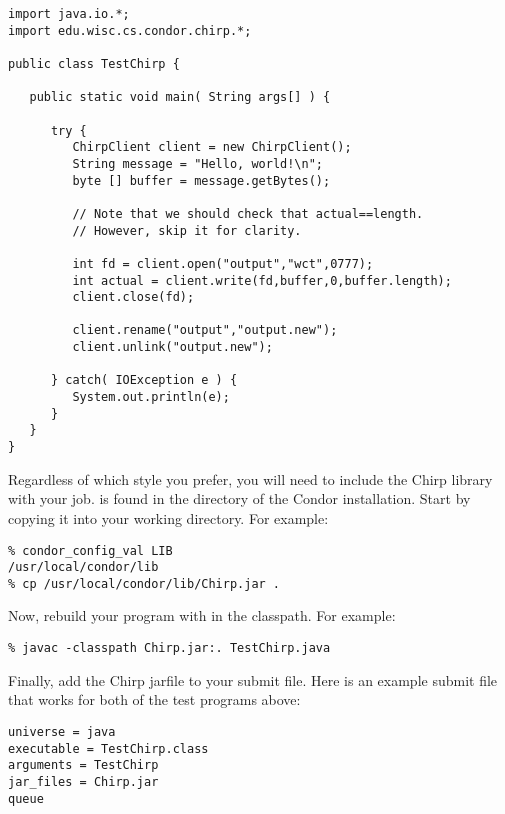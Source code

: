 \begin{verbatim}
import java.io.*;
import edu.wisc.cs.condor.chirp.*;

public class TestChirp {

   public static void main( String args[] ) {

      try {
         ChirpClient client = new ChirpClient();
         String message = "Hello, world!\n";
         byte [] buffer = message.getBytes();

         // Note that we should check that actual==length.
         // However, skip it for clarity.

         int fd = client.open("output","wct",0777);
         int actual = client.write(fd,buffer,0,buffer.length);
         client.close(fd);

         client.rename("output","output.new");
         client.unlink("output.new");

      } catch( IOException e ) {
         System.out.println(e);
      }
   }
}
\end{verbatim}

Regardless of which style you prefer, you will need to
include the Chirp library with your job.
 is found in the  directory of the
Condor installation.  Start by copying it into your working
directory. For example:

\begin{verbatim}
% condor_config_val LIB
/usr/local/condor/lib
% cp /usr/local/condor/lib/Chirp.jar .
\end{verbatim}

Now, rebuild your program with  in the classpath.
For example:

\begin{verbatim}
% javac -classpath Chirp.jar:. TestChirp.java
\end{verbatim}

Finally, add the Chirp jarfile to your submit file.
Here is an example submit file that works for both
of the test programs above:

\begin{verbatim}
universe = java
executable = TestChirp.class
arguments = TestChirp
jar_files = Chirp.jar
queue
\end{verbatim}
